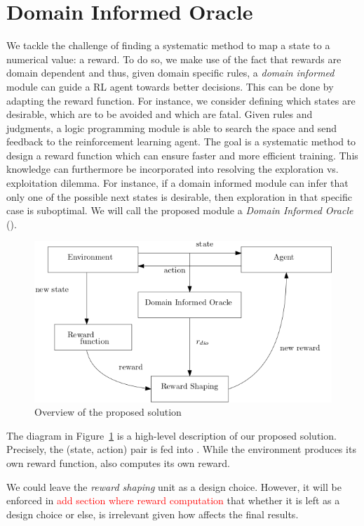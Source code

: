 \section{Domain Informed Oracle} 

We tackle the challenge of finding a systematic method to map a state to a numerical value: a reward. 
To do so, we make use of the fact that rewards are domain dependent and thus, given domain specific rules, a \emph{domain informed} module can guide a RL agent towards better decisions. This can be done by 
adapting the reward function. For instance, we consider defining which states are desirable, which are to be avoided and which are fatal. Given rules and judgments, a logic programming module 
is able to search the space and send feedback to the reinforcement learning agent. The goal is a systematic method to design a reward function which can ensure faster and more efficient 
training. This knowledge can furthermore be incorporated into resolving the exploration vs. exploitation dilemma. For instance, if a domain informed module 
can infer that only one of the possible next states is desirable, then exploration in that specific case is suboptimal.  
We will call the proposed module a \emph{Domain Informed Oracle}
(\dio{}).

\begin{figure}[H]
  \centering
  \includegraphics[scale=0.45]{figures/overview.png}
  \caption{Overview of the proposed solution}
  \label{fig:overview}
\end{figure}


The diagram in Figure~\ref{fig:overview} is a high-level description of our proposed solution. 
%
Precisely, the (state, action) pair is fed into \dio{}. While the environment produces its own 
reward function, \dio{} also computes its own reward. 

We could leave the \emph{reward shaping} unit as a design choice. However, it will be enforced in \textcolor{red}{add section where reward computation} 
that whether it is left as a design choice or else, is irrelevant given how\dio{} affects the final results.

